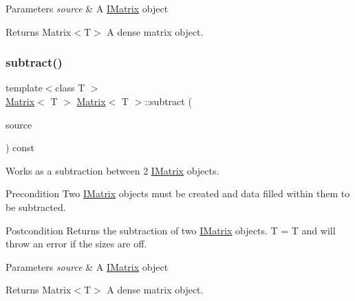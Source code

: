 \begin{DoxyParams}{Parameters}
{\em source} & A \mbox{\hyperlink{class_i_matrix}{I\+Matrix}} object \\
\hline
\end{DoxyParams}
\begin{DoxyReturn}{Returns}
Matrix$<$\+T$>$ A dense matrix object. 
\end{DoxyReturn}
\mbox{\label{class_matrix_a26f30ae5b84d1b7186826d3a7d878c7c}} 
\subsubsection{\texorpdfstring{subtract()}{subtract()}\hspace{0.1cm}{\footnotesize\ttfamily [3/6]}}
{\footnotesize\ttfamily template$<$class T $>$ \\
\mbox{\hyperlink{class_matrix}{Matrix}}$<$ T $>$ \mbox{\hyperlink{class_matrix}{Matrix}}$<$ T $>$\+::subtract (\begin{DoxyParamCaption}\item[{const \mbox{\hyperlink{class_i_matrix}{I\+Matrix}}$<$ \mbox{\hyperlink{class_l_matrix}{L\+Matrix}}$<$ T $>$, T $>$ \&}]{source }\end{DoxyParamCaption}) const}



Works as a subtraction between 2 \mbox{\hyperlink{class_i_matrix}{I\+Matrix}} objects. 

\begin{DoxyPrecond}{Precondition}
Two \mbox{\hyperlink{class_i_matrix}{I\+Matrix}} objects must be created and data filled within them to be subtracted. 
\end{DoxyPrecond}
\begin{DoxyPostcond}{Postcondition}
Returns the subtraction of two \mbox{\hyperlink{class_i_matrix}{I\+Matrix}} objects. T = T and will throw an error if the sizes are off.
\end{DoxyPostcond}

\begin{DoxyParams}{Parameters}
{\em source} & A \mbox{\hyperlink{class_i_matrix}{I\+Matrix}} object \\
\hline
\end{DoxyParams}
\begin{DoxyReturn}{Returns}
Matrix$<$\+T$>$ A dense matrix object. 
\end{DoxyReturn}
\mbox{\label{class_matrix_a2d19a259945e67f5eb61c0981d323da5}} 
